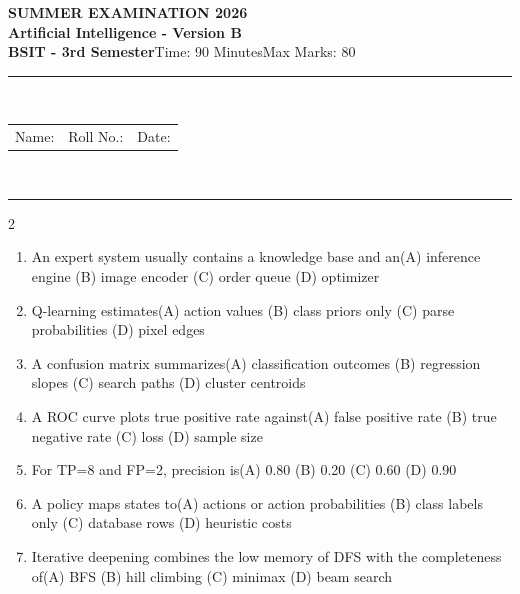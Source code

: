 \documentclass[a4paper]{article}
\makeatletter
\newcommand{\examheader}{%
\begin{center}\textbf{\large SUMMER EXAMINATION 2026}\\[-1pt]
\textbf{\normalsize Artificial Intelligence - Version B}\\[-1pt]
\textbf{BSIT - 3rd Semester}\quad Time: 90 Minutes\quad Max Marks: 80\\[-1pt]
\textcolor{black!65}{\rule{\linewidth}{0.45pt}}\\[-2pt]
\begin{tabularx}{\linewidth}{@{}X X X@{}}Name: \hrulefill & Roll No.: \hrulefill & Date: \hrulefill\end{tabularx}\\[-1pt]
\textcolor{black!65}{\rule{\linewidth}{0.45pt}}\end{center}}
\makeatother
\begin{document}
\examheader
\raggedcolumns
\begin{multicols*}{2}
\fontsize{8.5}{10}\selectfont
\begin{enumerate}
\item An expert system usually contains a knowledge base and an\newline\hspace*{0.6em}(A) inference engine \quad (B) image encoder \newline\hspace*{0.6em}(C) order queue \quad (D) optimizer
\item Q-learning estimates\newline\hspace*{0.6em}(A) action values \quad (B) class priors only \newline\hspace*{0.6em}(C) parse probabilities \quad (D) pixel edges
\item A confusion matrix summarizes\newline\hspace*{0.6em}(A) classification outcomes \quad (B) regression slopes \newline\hspace*{0.6em}(C) search paths \quad (D) cluster centroids
\item A ROC curve plots true positive rate against\newline\hspace*{0.6em}(A) false positive rate \quad (B) true negative rate \newline\hspace*{0.6em}(C) loss \quad (D) sample size
\item For TP=8 and FP=2, precision is\newline\hspace*{0.6em}(A) 0.80 \quad (B) 0.20 \newline\hspace*{0.6em}(C) 0.60 \quad (D) 0.90
\item A policy maps states to\newline\hspace*{0.6em}(A) actions or action probabilities \quad (B) class labels only \newline\hspace*{0.6em}(C) database rows \quad (D) heuristic costs
\item Iterative deepening combines the low memory of DFS with the completeness of\newline\hspace*{0.6em}(A) BFS \quad (B) hill climbing \newline\hspace*{0.6em}(C) minimax \quad (D) beam search

\end{enumerate}
\end{multicols*}
\end{document}
